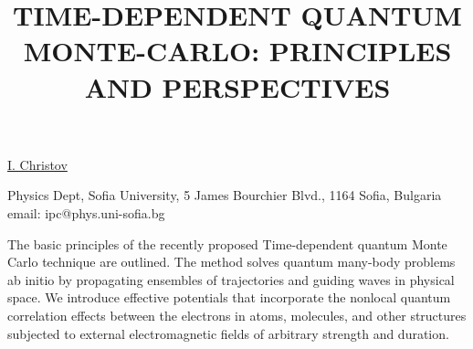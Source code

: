\title{TIME-DEPENDENT QUANTUM MONTE-CARLO: PRINCIPLES AND PERSPECTIVES}

\underline{I. Christov}


Physics Dept, Sofia University,
5 James Bourchier Blvd.,
1164 Sofia, Bulgaria\\
email: ipc@phys.uni-sofia.bg

The basic principles of the recently proposed Time-dependent quantum Monte Carlo technique
are outlined. The method solves quantum many-body problems ab initio by
propagating ensembles of trajectories and guiding waves in physical space.
We introduce effective potentials that incorporate the nonlocal quantum correlation effects between the electrons in atoms, molecules, and other structures subjected to external electromagnetic fields of arbitrary strength and duration.

\vspace{\baselineskip}